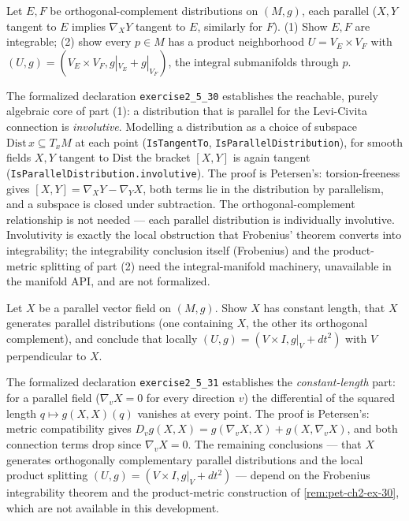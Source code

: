 \begin{remark}
  \label{rem:pet-ch2-ex-30}
  \leanok
  Let $E,F$ be orthogonal-complement distributions on $(M,g)$, each parallel
  ($X,Y$ tangent to $E$ implies $\nabla_XY$ tangent to $E$, similarly for
  $F$). (1) Show $E,F$ are integrable; (2) show every $p\in M$ has a product
  neighborhood $U=V_E\times V_F$ with
  $(U,g)=(V_E\times V_F,g|_{V_E}+g|_{V_F})$, the integral submanifolds through
  $p$.

  The formalized declaration \texttt{exercise2\_5\_30} establishes the reachable,
  purely algebraic core of part (1): a distribution that is parallel for the
  Levi-Civita connection is \emph{involutive}. Modelling a distribution as a
  choice of subspace $\mathrm{Dist}\,x\subseteq T_xM$ at each point
  (\texttt{IsTangentTo}, \texttt{IsParallelDistribution}), for smooth fields
  $X,Y$ tangent to $\mathrm{Dist}$ the bracket $[X,Y]$ is again tangent
  (\texttt{IsParallelDistribution.involutive}). The proof is Petersen's:
  torsion-freeness gives $[X,Y]=\nabla_XY-\nabla_YX$, both terms lie in the
  distribution by parallelism, and a subspace is closed under subtraction. The
  orthogonal-complement relationship is not needed — each parallel distribution
  is individually involutive. Involutivity is exactly the local obstruction that
  Frobenius' theorem converts into integrability; the integrability conclusion
  itself (Frobenius) and the product-metric splitting of part (2) need the
  integral-manifold machinery, unavailable in the manifold API, and are not
  formalized.
\end{remark}

\begin{remark}
  \label{rem:pet-ch2-ex-31}
  \leanok
  Let $X$ be a parallel vector field on $(M,g)$. Show $X$ has constant
  length, that $X$ generates parallel distributions (one containing $X$, the
  other its orthogonal complement), and conclude that locally
  $(U,g)=(V\times I,g|_V+dt^2)$ with $V$ perpendicular to $X$.

  The formalized declaration \texttt{exercise2\_5\_31} establishes the
  \emph{constant-length} part: for a parallel field ($\nabla_vX=0$ for every
  direction $v$) the differential of the squared length $q\mapsto g(X,X)(q)$
  vanishes at every point. The proof is Petersen's: metric compatibility gives
  $D_vg(X,X)=g(\nabla_vX,X)+g(X,\nabla_vX)$, and both connection terms drop since
  $\nabla_vX=0$. The remaining conclusions — that $X$ generates orthogonally
  complementary parallel distributions and the local product splitting
  $(U,g)=(V\times I,g|_V+dt^2)$ — depend on the Frobenius integrability theorem
  and the product-metric construction of \cref{rem:pet-ch2-ex-30}, which are not
  available in this development.
\end{remark}

